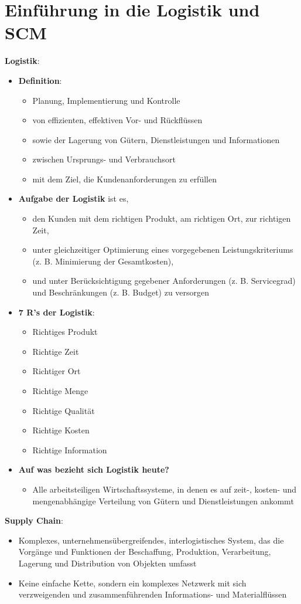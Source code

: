 \section{Einführung in die Logistik und SCM}

\textbf{Logistik}:
\begin{itemize}
	\item \textbf{Definition}: 
	\begin{itemize}
		\item Planung, Implementierung und Kontrolle 
		\item von effizienten, effektiven Vor- und Rückflüssen 
		\item sowie der Lagerung von Gütern, Dienstleistungen und Informationen 
		\item zwischen Ursprungs- und Verbrauchsort 
		\item mit dem Ziel, die Kundenanforderungen zu erfüllen
	\end{itemize}
	\item \textbf{Aufgabe der Logistik} ist es,
	\begin{itemize}
		\item den Kunden mit dem richtigen Produkt, am richtigen Ort, zur richtigen Zeit,
		\item unter gleichzeitiger Optimierung eines vorgegebenen Leistungskriteriums (z. B.
		Minimierung der Gesamtkosten),
		\item und unter Berücksichtigung gegebener Anforderungen (z. B. Servicegrad) und
		Beschränkungen (z. B. Budget) zu versorgen
	\end{itemize}
	\item \textbf{7 R's der Logistik}:
	\begin{itemize}
		\item Richtiges Produkt
		\item Richtige Zeit
		\item Richtiger Ort
		\item Richtige Menge
		\item Richtige Qualität
		\item Richtige Kosten
		\item Richtige Information
	\end{itemize}
	\item \textbf{Auf was bezieht sich Logistik heute?}
	\begin{itemize}
		\item Alle arbeitsteiligen Wirtschaftssysteme, in denen es auf zeit-, kosten- und mengenabhängige Verteilung von Gütern und Dienstleistungen ankommt
	\end{itemize}
\end{itemize}
\bigskip
\textbf{Supply Chain}: 
\begin{itemize}
	\item Komplexes, unternehmensübergreifendes, interlogistisches System, das die Vorgänge und Funktionen der Beschaffung, Produktion, Verarbeitung, Lagerung und Distribution von Objekten umfasst
	\item Keine einfache Kette, sondern ein komplexes Netzwerk mit sich verzweigenden und zusammenführenden Informations- und Materialflüssen
\end{itemize}

